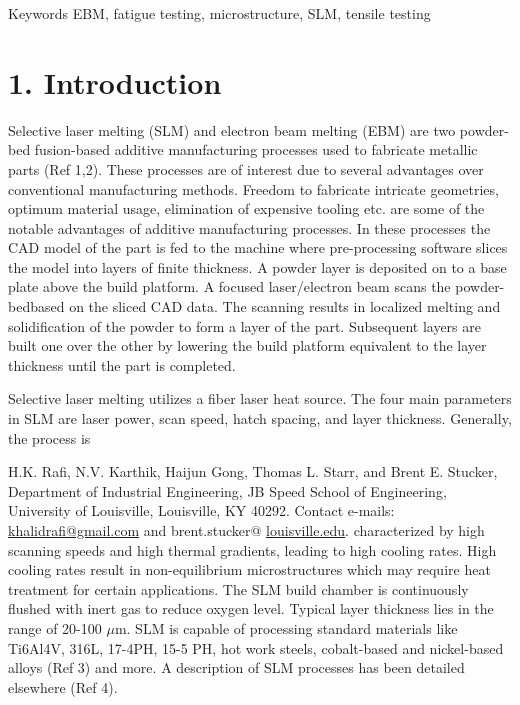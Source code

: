 \documentclass[10pt]{article}
\begin{document}
Keywords EBM, fatigue testing, microstructure, SLM, tensile testing

\section*{1. Introduction}
Selective laser melting (SLM) and electron beam melting (EBM) are two powder-bed fusion-based additive manufacturing processes used to fabricate metallic parts (Ref 1,2). These processes are of interest due to several advantages over conventional manufacturing methods. Freedom to fabricate intricate geometries, optimum material usage, elimination of expensive tooling etc. are some of the notable advantages of additive manufacturing processes. In these processes the CAD model of the part is fed to the machine where pre-processing software slices the model into layers of finite thickness. A powder layer is deposited on to a base plate above the build platform. A focused laser/electron beam scans the powder-bedbased on the sliced CAD data. The scanning results in localized melting and solidification of the powder to form a layer of the part. Subsequent layers are built one over the other by lowering the build platform equivalent to the layer thickness until the part is completed.

Selective laser melting utilizes a fiber laser heat source. The four main parameters in SLM are laser power, scan speed, hatch spacing, and layer thickness. Generally, the process is

H.K. Rafi, N.V. Karthik, Haijun Gong, Thomas L. Starr, and Brent E. Stucker, Department of Industrial Engineering, JB Speed School of Engineering, University of Louisville, Louisville, KY 40292. Contact e-mails: \href{mailto:khalidrafi@gmail.com}{khalidrafi@gmail.com} and brent.stucker@ \href{http://louisville.edu}{louisville.edu}. characterized by high scanning speeds and high thermal gradients, leading to high cooling rates. High cooling rates result in non-equilibrium microstructures which may require heat treatment for certain applications. The SLM build chamber is continuously flushed with inert gas to reduce oxygen level. Typical layer thickness lies in the range of 20-100 $\mu \mathrm{m}$. SLM is capable of processing standard materials like Ti6Al4V, 316L, 17-4PH, 15-5 PH, hot work steels, cobalt-based and nickel-based alloys (Ref 3) and more. A description of SLM processes has been detailed elsewhere (Ref 4).
\end{document}
